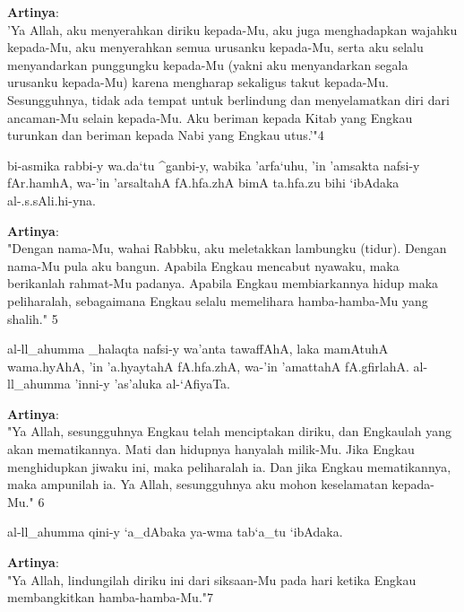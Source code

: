 \documentclass[a4paper,12pt]{article}
\begin{document}
\noindent
\textbf{Artinya}:\\
\indent
'Ya Allah, aku menyerahkan diriku kepada-Mu, aku juga menghadapkan wajahku 
kepada-Mu, aku menyerahkan semua urusanku kepada-Mu, serta aku selalu 
menyandarkan punggungku kepada-Mu (yakni aku menyandarkan segala urusanku 
kepada-Mu) karena mengharap sekaligus takut kepada-Mu. Sesungguhnya, tidak 
ada tempat untuk berlindung dan menyelamatkan diri dari ancaman-Mu selain 
kepada-Mu. Aku beriman kepada Kitab yang Engkau turunkan dan beriman kepada 
Nabi yang Engkau utus.'"{\scriptsize 4}\\
\begin{arabtext}
\noindent
bi-asmika rabbi-y wa.da`tu ^ganbi-y, wabika 'arfa`uhu, 'in 'amsakta nafsi-y 
fAr.hamhA, wa-'in 'arsaltahA fA.hfa.zhA bimA ta.hfa.zu bihi `ibAdaka 
al-.s.sAli.hi-yna.\\
\end{arabtext}
\noindent
\textbf{Artinya}:\\
\indent
"Dengan nama-Mu, wahai Rabbku, aku meletakkan lambungku (tidur). Dengan 
nama-Mu pula aku bangun. Apabila Engkau mencabut nyawaku, maka berikanlah 
rahmat-Mu padanya. Apabila Engkau membiarkannya hidup maka peliharalah, 
sebagaimana Engkau selalu memelihara hamba-hamba-Mu yang shalih." 
{\scriptsize 5}\\
\begin{arabtext}
\noindent
al-ll_ahumma _halaqta nafsi-y wa'anta tawaffAhA, laka mamAtuhA wama.hyAhA, 
'in 'a.hyaytahA fA.hfa.zhA, wa-'in 'amattahA fA.gfirlahA. al-ll_ahumma 
'inni-y 'as'aluka al-`AfiyaTa.\\
\end{arabtext}
\noindent
\textbf{Artinya}:\\
\indent
"Ya Allah, sesungguhnya Engkau telah menciptakan diriku, dan Engkaulah 
yang akan mematikannya. Mati dan hidupnya hanyalah milik-Mu. Jika Engkau 
menghidupkan jiwaku ini, maka peliharalah ia. Dan jika Engkau mematikannya, 
maka ampunilah ia. Ya Allah, sesungguhnya aku mohon keselamatan kepada-Mu." 
{\scriptsize 6}\\
\begin{arabtext}
\noindent
al-ll_ahumma qini-y `a_dAbaka ya-wma tab`a_tu `ibAdaka.\\
\end{arabtext}
\noindent
\textbf{Artinya}:\\
\indent
"Ya Allah, lindungilah diriku ini dari siksaan-Mu pada hari ketika Engkau 
membangkitkan hamba-hamba-Mu."{\scriptsize 7}\\
\end{document}

